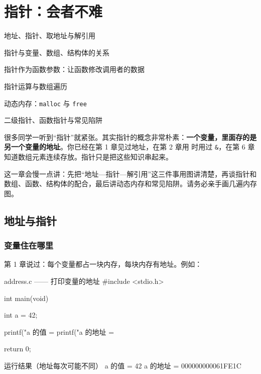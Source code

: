 \chapter{指针：会者不难}

\begin{introduction}
  \item 地址、指针、取地址与解引用
  \item 指针与变量、数组、结构体的关系
  \item 指针作为函数参数：让函数修改调用者的数据
  \item 指针运算与数组遍历
  \item 动态内存：\texttt{malloc} 与 \texttt{free}
  \item 二级指针、函数指针与常见陷阱
\end{introduction}


很多同学一听到“指针”就紧张。其实指针的概念非常朴素：\textbf{一个变量，里面存的是另一个变量的地址}。你已经在第 1 章见过地址，在第 2 章用  时用过 \texttt{\&}，在第 6 章知道数组元素连续存放。指针只是把这些知识串起来。

这一章会慢一点讲：先把“地址—指针—解引用”这三件事用图讲清楚，再谈指针和数组、函数、结构体的配合，最后讲动态内存和常见陷阱。请务必亲手画几遍内存图。

\section{地址与指针}

\subsection{变量住在哪里}

第 1 章说过：每个变量都占一块内存，每块内存有地址。例如：

\begin{codebox}{address.c —— 打印变量的地址}
#include <stdio.h>

int main(void)
{
    int a = 42;

    printf("a 的值   = %
    printf("a 的地址 = %

    return 0;
}
\end{codebox}

\begin{outbox}{运行结果（地址每次可能不同）}
a 的值   = 42
a 的地址 = 000000000061FE1C
\end{outbox}

